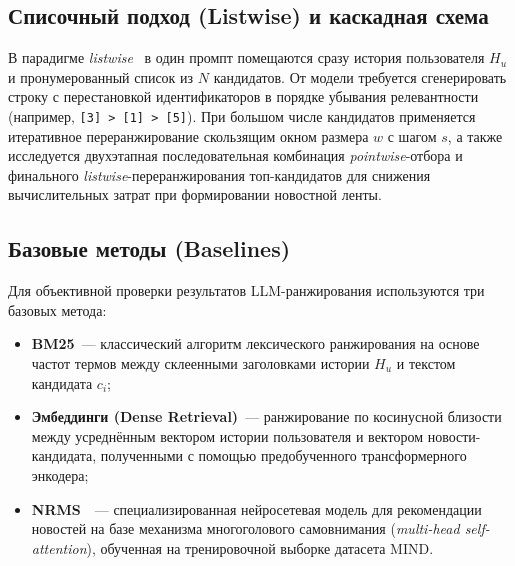 \documentclass{misisarticle}
\begin{document}
\subsection{Списочный подход (Listwise) и каскадная схема}

В парадигме \textit{listwise}~\cite{sun2023chatgpt} в один промпт помещаются сразу история пользователя $H_u$ и пронумерованный список из $N$ кандидатов. От модели требуется сгенерировать строку с перестановкой идентификаторов в порядке убывания релевантности (например, \texttt{[3] > [1] > [5]}). При большом числе кандидатов применяется итеративное переранжирование скользящим окном размера $w$ с шагом $s$, а также исследуется двухэтапная последовательная комбинация \textit{pointwise}-отбора и финального \textit{listwise}-переранжирования топ-кандидатов для снижения вычислительных затрат при формировании новостной ленты.

\subsection{Базовые методы (Baselines)}

Для объективной проверки результатов LLM-ранжирования используются три базовых метода:
\begin{itemize}
  \item \textbf{BM25}~--- классический алгоритм лексического ранжирования на основе частот термов между склеенными заголовками истории $H_u$ и текстом кандидата $c_i$;
  \item \textbf{Эмбеддинги (Dense Retrieval)}~--- ранжирование по косинусной близости между усреднённым вектором истории пользователя и вектором новости-кандидата, полученными с помощью предобученного трансформерного энкодера;
  \item \textbf{NRMS}~\cite{wu2019nrms}~--- специализированная нейросетевая модель для рекомендации новостей на базе механизма многоголового самовнимания (\textit{multi-head self-attention}), обученная на тренировочной выборке датасета MIND.
\end{itemize}
\end{document}
